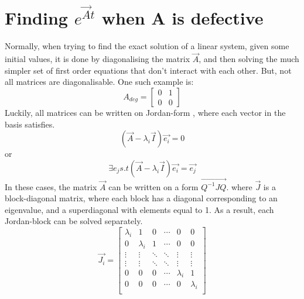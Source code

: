 \section{Finding \texorpdfstring{$e^{\Vec{A}t}$}{}  when A is  defective}
\label{sec:finding_eAt_when_A_is_defective}
Normally, when trying to find the exact solution of a linear system, given some initial values, it is done by diagonalising the matrix $\Vec{A}$, and then solving the much simpler set of first order equations that don't interact with each other. But, not all matrices are diagonalisable. One such example is: 
\begin{equation}
    A_{deg} = 
    \begin{bmatrix}
        0 & 1 \\ 
        0 & 0 
    \end{bmatrix}
\end{equation}
Luckily, all matrices can be written on Jordan-form \cite[Chp 1]{Triangle_inequality_source}, where each vector in the basis satisfies. 
\begin{equation}
    (\Vec{A}- \lambda_i \Vec{I})\Vec{e_i} = 0
\end{equation}
or
\begin{equation}
    \exists e_j s.t  (\Vec{A}- \lambda_i \Vec{I})\Vec{e_i} = \Vec{e_j}
\end{equation}
In these cases, the matrix $\Vec{A}$ can be written on a form $\Vec{Q^{-1} J Q}$. where $\Vec{J}$ is a block-diagonal matrix, where each block has a diagonal corresponding to an eigenvalue, and a superdiagonal with elements equal to 1. As a result, each Jordan-block can be solved separately. 
\begin{equation}
    \Vec{J_i} = 
    \begin{bmatrix}
        \lambda_i & 1         & 0      & \cdots &0          &0\\
        0         & \lambda_i & 1      &\cdots  & 0         &0\\
        \vdots    & \vdots    & \ddots & \ddots & \vdots    & \vdots \\
        \vdots    & \vdots    & \ddots & \ddots & \vdots    & \vdots \\
        0         & 0         & 0      & \cdots & \lambda_i & 1 \\
        0         & 0         & 0      & \cdots & 0         & \lambda_i \\
    \end{bmatrix}
\end{equation}

